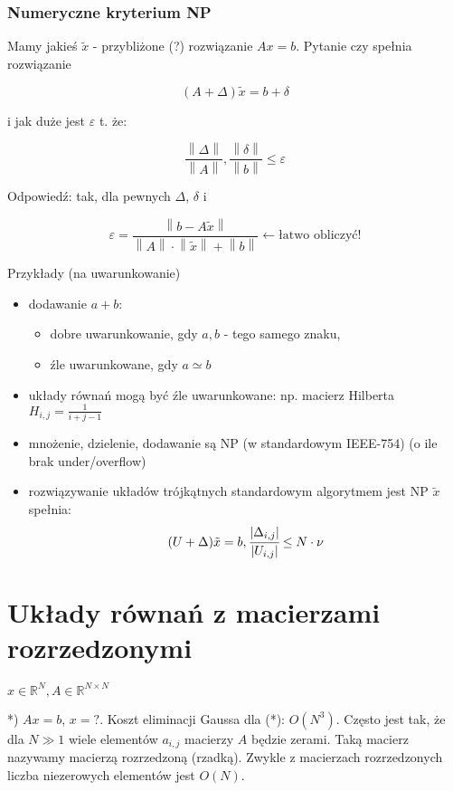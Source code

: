 \documentclass[hidelinks,a4paper]{article}
\newcommand{\RR}{\mathbb{R}}
\newcommand{\la}{\leftarrow}
\newcommand{\norm}[1]{\left\lVert#1\right\rVert}
\begin{document}
\subsubsection{Numeryczne kryterium NP}

Mamy jakieś $\tilde{x}$ - przybliżone (?) rozwiązanie $Ax = b$. Pytanie czy spełnia rozwiązanie

\[
	(A + \Delta)\tilde{x} = b + \delta
\]

i jak duże jest $\varepsilon$ t. że:

\[
	\frac{\norm{\Delta}}{\norm{A}}, \frac{\norm{\delta}}{\norm{b}} \leq \varepsilon
\]

Odpowiedź: tak, dla pewnych $\Delta$, $\delta$ i 

\[
	\varepsilon = \frac{\norm{b - A\tilde{x}}}{\norm{A} \cdot \norm{\tilde{x}} + \norm{b}} \la \textrm{łatwo obliczyć!}
\]

Przykłady (na uwarunkowanie)

\begin{itemize}
	\item dodawanie $a+b$:
	      \begin{itemize}
	      	\item dobre uwarunkowanie, gdy $a, b$ -  tego samego znaku,
	      	\item źle uwarunkowane, gdy $a \simeq b$
	      \end{itemize}
	\item układy równań mogą być źle uwarunkowane: np. macierz Hilberta $H_{i,j} = \frac{1}{i+j-1}$
	\item mnożenie, dzielenie, dodawanie są NP (w standardowym IEEE-754) (o ile brak under/overflow)
	\item rozwiązywanie układów trójkątnych standardowym algorytmem jest NP $\tilde{x}$ spełnia:
	      \[
	      	(U+\Delta)\tilde{x} = b, \cfrac{|\Delta_{i, j}|}{|U_{i, j}|} \leq N \cdot \nu
	      \]
\end{itemize}

\section{Układy równań z macierzami rozrzedzonymi}

$x \in \RR^N, A \in \RR^{N \times N}$

*) $Ax = b$, $x = ?$. Koszt eliminacji Gaussa dla (*): $O(N^3)$. Często jest tak, że dla $N \gg 1$ wiele elementów $a_{i,j}$ macierzy $A$ będzie zerami. Taką macierz nazywamy macierzą rozrzedzoną (rzadką). Zwykle z macierzach rozrzedzonych liczba niezerowych elementów jest $O(N)$.
\end{document}
